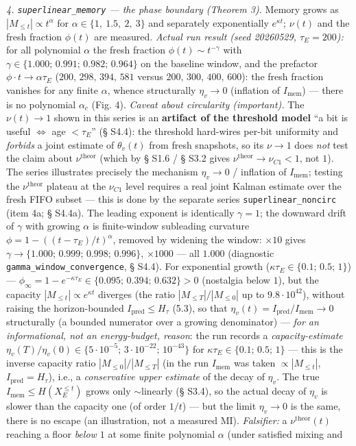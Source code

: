 \documentclass[12pt]{iopart}
\begin{document}
\emph{4. \texttt{superlinear\_memory} --- the phase boundary (Theorem 3).} Memory grows as \(|M_{\le t}| \propto t^\alpha\) for \(\alpha \in \{1,\ 1.5,\ 2,\ 3\}\) and separately exponentially \(e^{\kappa t}\); \(\nu(t)\) and the fresh fraction \(\phi(t)\) are measured. \emph{Actual run result (seed 20260529, \(\tau_E = 200\)):} for all polynomial \(\alpha\) the fresh fraction \(\phi(t) \sim t^{-\gamma}\) with \(\gamma \in \{1.000;\,0.991;\,0.982;\,0.964\}\) on the baseline window, and the prefactor \(\phi\cdot t \to \alpha\tau_E\) (\(200,\,298,\,394,\,581\) versus \(200,\,300,\,400,\,600\)): the fresh fraction vanishes for any finite \(\alpha\), whence structurally \(\eta_v \to 0\) (inflation of \(I_{\text{mem}}\)) --- there is no polynomial \(\alpha_c\) (Fig. 4). \emph{Caveat about circularity (important).} The \(\nu(t) \to 1\) shown in this series is an \textbf{artifact of the threshold model} ``a bit is useful \(\Leftrightarrow\) age \(< \tau_E\)'' (§ S4.4): the threshold hard-wires per-bit uniformity and \emph{forbids} a joint estimate of \(\theta_v(t)\) from fresh snapshots, so its \(\nu \to 1\) does \emph{not} test the claim about \(\nu^{\text{theor}}\) (which by § S1.6 / § S3.2 gives \(\nu^{\text{theor}} \to \nu_{C1} < 1\), not \(1\)). The series illustrates precisely the mechanism \(\eta_v \to 0\) / inflation of \(I_{\text{mem}}\); testing the \(\nu^{\text{theor}}\) plateau at the \(\nu_{C1}\) level requires a real joint Kalman estimate over the fresh FIFO subset --- this is done by the separate series \texttt{superlinear\_noncirc} (item 4a; § S4.4a). The leading exponent is identically \(\gamma = 1\); the downward drift of \(\gamma\) with growing \(\alpha\) is finite-window subleading curvature \(\phi = 1-((t-\tau_E)/t)^\alpha\), removed by widening the window: \(\times10\) gives \(\gamma \to \{1.000;\,0.999;\,0.998;\,0.996\}\), \(\times1000\) --- all \(1.000\) (diagnostic \texttt{gamma\_window\_convergence}, § S4.4). For exponential growth (\(\kappa\tau_E \in \{0.1;\,0.5;\,1\}\)) --- \(\phi_\infty = 1-e^{-\kappa\tau_E} \in \{0.095;\,0.394;\,0.632\} > 0\) (nostalgia below \(1\)), but the capacity \(|M_{\le t}| \propto e^{\kappa t}\) diverges (the ratio \(|M_{\le T}|/|M_{\le 0}|\) up to \(9.8\cdot10^{42}\)), without raising the horizon-bounded \(I_{\text{pred}} \le H_\tau\) (5.3), so that \(\eta_v(t) = I_{\text{pred}}/I_{\text{mem}} \to 0\) structurally (a bounded numerator over a growing denominator) --- \emph{for an informational, not an energy-budget, reason}: the run records a \emph{capacity-estimate} \(\eta_v(T)/\eta_v(0) \in \{5\cdot10^{-5};\,3\cdot10^{-22};\,10^{-43}\}\) for \(\kappa\tau_E \in \{0.1;\,0.5;\,1\}\) --- this is the inverse capacity ratio \(|M_{\le 0}|/|M_{\le T}|\) (in the run \(I_{\text{mem}}\) was taken \(\propto |M_{\le t}|\), \(I_{\text{pred}} = H_\tau\)), i.e., a \emph{conservative upper estimate} of the decay of \(\eta_v\). The true \(I_{\text{mem}} \le H(X_E^{\le t})\) grows only \(\sim\)linearly (§ S3.4), so the actual decay of \(\eta_v\) is slower than the capacity one (of order \(1/t\)) --- but the limit \(\eta_v \to 0\) is the same, there is no escape (an illustration, not a measured MI). \emph{Falsifier:} a \(\nu^{\text{theor}}(t)\) reaching a floor \emph{below \(1\)} at some finite polynomial \(\alpha\) (under satisfied mixing and 
\end{document}
